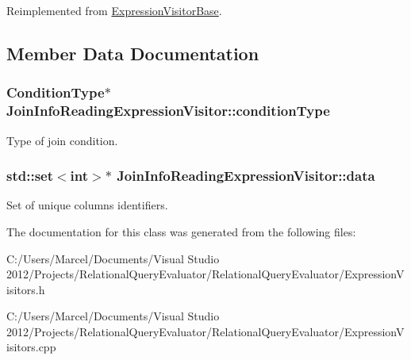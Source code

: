 Reimplemented from \hyperlink{class_expression_visitor_base_a9750397f5588263509a28ca9f17e8bc4}{Expression\+Visitor\+Base}.



\subsection{Member Data Documentation}
\hypertarget{class_join_info_reading_expression_visitor_af7219e9cb55b9a59763a06df0656a63f}{
\subsubsection[{condition\+Type}]{\setlength{\rightskip}{0pt plus 5cm}Condition\+Type$\ast$ Join\+Info\+Reading\+Expression\+Visitor\+::condition\+Type}}\label{class_join_info_reading_expression_visitor_af7219e9cb55b9a59763a06df0656a63f}
Type of join condition. \hypertarget{class_join_info_reading_expression_visitor_aa7bdb75b8bb8ddbbb551c26f798503ca}{
\subsubsection[{data}]{\setlength{\rightskip}{0pt plus 5cm}std\+::set$<$int$>$$\ast$ Join\+Info\+Reading\+Expression\+Visitor\+::data}}\label{class_join_info_reading_expression_visitor_aa7bdb75b8bb8ddbbb551c26f798503ca}
Set of unique columns identifiers. 

The documentation for this class was generated from the following files\+:\begin{DoxyCompactItemize}
\item 
C\+:/\+Users/\+Marcel/\+Documents/\+Visual Studio 2012/\+Projects/\+Relational\+Query\+Evaluator/\+Relational\+Query\+Evaluator/Expression\+Visitors.\+h\item 
C\+:/\+Users/\+Marcel/\+Documents/\+Visual Studio 2012/\+Projects/\+Relational\+Query\+Evaluator/\+Relational\+Query\+Evaluator/Expression\+Visitors.\+cpp\end{DoxyCompactItemize}

